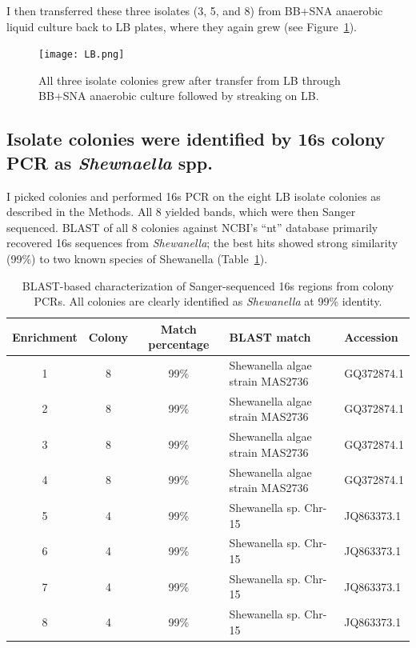 \documentclass{article}
\begin{document}
I then transferred these three isolates (3, 5, and 8) from BB+SNA
anaerobic liquid culture back to LB plates, where they again grew
(see Figure~\ref{fig:LB}).

\begin{figure}[!ht]
  \centerline{\texttt{[image: LB.png]}}
  \caption{All three isolate colonies grew after transfer from LB
    through BB+SNA anaerobic culture followed by streaking on LB.}
  \label{fig:LB}
\end{figure}

\subsection*{Isolate colonies were identified by 16s colony PCR as {\em Shewnaella} spp.}

I picked colonies and performed 16s PCR on the eight LB isolate
colonies as described in the Methods.  All 8 yielded bands, which were
then Sanger sequenced.  BLAST of all 8 colonies against NCBI's ``nt''
database primarily recovered 16s sequences from {\em Shewanella}; the
best hits showed strong similarity (99\%) to two known species of
Shewanella (Table~\ref{tab:16s}).

\begin{table}
\centering
\begin{tabular}{|c|c|c|l|l|}
\hline
Enrichment & Colony & Match percentage & BLAST match & Accession \\
\hline
1 &
8 &
99\% &
Shewanella algae strain MAS2736 &
GQ372874.1 \\

2 &
8 &
99\% &
Shewanella algae strain MAS2736 &
GQ372874.1 \\

3 &
8 &
99\% &
Shewanella algae strain MAS2736 &
GQ372874.1 \\

4 &
8 &
99\% &
Shewanella algae strain MAS2736 &
GQ372874.1 \\

5 &
4 &
99\% &
Shewanella sp. Chr-15 &
JQ863373.1 \\

6 &
4 &
99\% &
Shewanella sp. Chr-15 &
JQ863373.1 \\

7 &
4 &
99\% &
Shewanella sp. Chr-15 &
JQ863373.1 \\

8 &
4 &
99\% &
Shewanella sp. Chr-15 &
JQ863373.1 \\
\hline
\end{tabular}
\caption{BLAST-based characterization of Sanger-sequenced 16s regions from colony PCRs.  All colonies are clearly identified as {\em Shewanella} at 99\% identity.}
\label{tab:16s}
\end{table}
\end{document}
